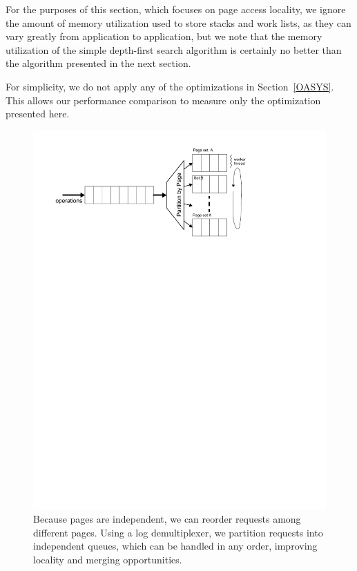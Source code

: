 \documentclass[10pt,letterpaper,twocolumn,english]{article}
\begin{document}
For the purposes of this section, which focuses on page access
locality, we ignore the amount of memory utilization used to store
stacks and work lists, as they can vary greatly from application to
application, but we note that the memory utilization of the simple
depth-first search algorithm is certainly no better than the algorithm
presented in the next section.

For simplicity, we do not apply any of the optimizations in
Section~\ref{OASYS}.  This allows our performance comparison to
 measure only the optimization presented here.


\begin{figure}
\includegraphics[width=1\columnwidth]{../paper2/graph-traversal.pdf}
\vspace{-24pt}
\caption{\sf\label{fig:multiplexor} Because pages are independent, we
can reorder requests among different pages. Using a log demultiplexer,
we partition requests into independent queues, which can be 
handled in any order, improving locality and merging opportunities.}
\end{figure}
\end{document}

